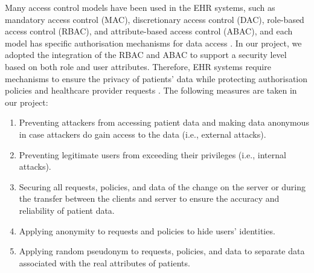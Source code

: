 \documentclass[journal,article,submit,moreauthors,pdftex]{Definitions/mdpi}
\begin{document}
Many access control models have been used in the EHR systems, such as mandatory access control (MAC), discretionary access control (DAC), role-based access control (RBAC), and attribute-based access control (ABAC), and each model has specific authorisation mechanisms for data access \cite{fp12}.
In our project, we adopted the integration of the RBAC and ABAC to support a security level based on both role and user attributes. Therefore, EHR systems require mechanisms to ensure the privacy of patients' data while protecting authorisation policies and healthcare provider requests \cite{fp10}.
The following measures are taken in our project:
\begin{enumerate}
\item Preventing attackers from accessing patient data and making data anonymous in case attackers do gain access to the data (i.e., external attacks).
\item Preventing legitimate users from exceeding their privileges (i.e., internal attacks).
\item Securing all requests, policies, and data of the change on the server or during the transfer between the clients and server to ensure the accuracy and reliability of patient data.
\item Applying anonymity to requests and policies to hide users' identities.
\item Applying random pseudonym to requests, policies, and data to separate data associated with the real attributes of patients.
\end{enumerate}
\end{document}
